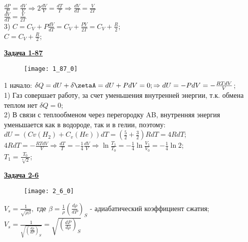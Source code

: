 \documentclass[12pt]{article}
\begin{document}
{$\frac{dP}{P}=\frac{dV}{V}\Rightarrow 2\frac{dV}{V}=\frac{dT}{T} \Rightarrow \frac{dV}{dT}=\frac{V}{2T}$\\

$\frac{dV}{dT}=\frac{V}{2T}$\\

3) $C=C_V+P\frac{dV}{dT}=C_V+\frac{PV}{2T}=C_V+\frac{R}{2}$;\\

$C=C_V+\frac{R}{2}$;


\newpage


{\underline\bf Задача 1-87}


\begin{figure}[h]
\texttt{[image: 1\_87\_0]}
\end{figure}

1 начало: $\delta Q=dU+\delta \zetaA=dU+PdV=0; \Rightarrow dU=-PdV=-\frac{RTdV}{V}$;\\

1) Газ совершает работу, за счет уменьшения внутренней энергии, т.к. обмена теплом нет $\delta Q=0$;\\

2) В связи с теплообменом через перегородку AB, внутренняя энергия уменьшается как в водороде, так и в гелии, поэтому:\\

$dU=(Cv (H_2)+C_v (He))dT=(\frac{5}{2}+\frac{3}{2})RdT=4RdT$;\\

$4RdT=-\frac{RTdV}{V} \Rightarrow \frac{dT}{T}=-\frac{1}{4}\frac{dV}{V}\Rightarrow \ln\frac{T_1}{T_0}=-\frac{1}{4}\ln\frac{V_1}{V_0}=-\frac{1}{4}\ln2$;\\

$T_1=\frac{T_0}{\sqrt[4]{2}}$;



\newpage

{\underline\bf Задача 2-6}

\begin{figure}[h]
\texttt{[image: 2\_6\_0]}
\end{figure}

\vspace{1cm}

$V_s=\frac{1}{\sqrt{\rho\beta}},$ где $\beta=\frac{1}{\rho}(\frac{d\rho}{dP})_S$ - адиабатический коэффициент сжатия;\\

$V_s=\frac{1}{\sqrt{(\frac{d\rho}{dP})_S}}=\sqrt{(\frac{dP}{d\rho})_S}$\\

}
\end{document}
